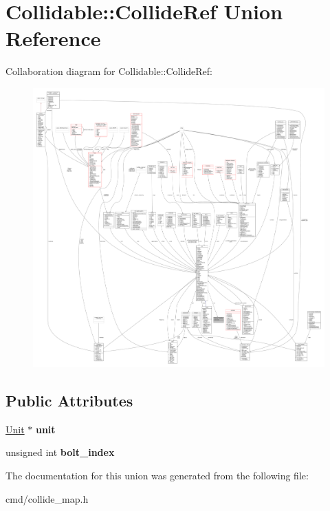 \hypertarget{unionCollidable_1_1CollideRef}{}\section{Collidable\+:\+:Collide\+Ref Union Reference}
\label{unionCollidable_1_1CollideRef}


Collaboration diagram for Collidable\+:\+:Collide\+Ref\+:
\nopagebreak
\begin{figure}[H]
\begin{center}
\leavevmode
\includegraphics[width=350pt]{d0/dc2/unionCollidable_1_1CollideRef__coll__graph}
\end{center}
\end{figure}
\subsection*{Public Attributes}
\begin{DoxyCompactItemize}
\item 
\hyperlink{classUnit}{Unit} $\ast$ {\bfseries unit}\hypertarget{unionCollidable_1_1CollideRef_a080872c82c9f01c7c16f5e4330b7d197}{}\label{unionCollidable_1_1CollideRef_a080872c82c9f01c7c16f5e4330b7d197}

\item 
unsigned int {\bfseries bolt\+\_\+index}\hypertarget{unionCollidable_1_1CollideRef_a4997b0d84a675e568bafbf75828ce6b3}{}\label{unionCollidable_1_1CollideRef_a4997b0d84a675e568bafbf75828ce6b3}

\end{DoxyCompactItemize}


The documentation for this union was generated from the following file\+:\begin{DoxyCompactItemize}
\item 
cmd/collide\+\_\+map.\+h\end{DoxyCompactItemize}
